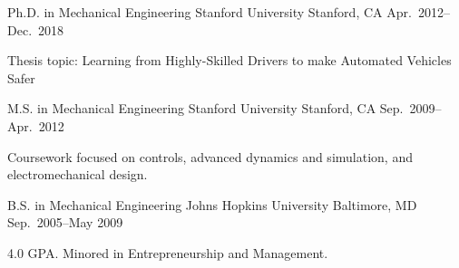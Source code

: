 \begin{cventries}
  \cventry%
    {Ph.D. in Mechanical Engineering}
    {Stanford University}
    {Stanford, CA}
    {Apr.\ 2012--Dec.\ 2018}
    {
      \begin{cvitems}
        \item{Thesis topic: Learning from Highly-Skilled Drivers to make Automated Vehicles Safer}
      \end{cvitems}
    }

  \cventry
    {M.S. in Mechanical Engineering}
    {Stanford University}
    {Stanford, CA}
    {Sep.\ 2009--Apr.\ 2012}
    {
      \begin{cvitems}
        \item{Coursework focused on controls, advanced dynamics and simulation, and electromechanical design.}
      \end{cvitems}
    }

  \cventry
    {B.S. in Mechanical Engineering}
    {Johns Hopkins University}
    {Baltimore, MD}
    {Sep.\ 2005--May 2009}
    {
      \begin{cvitems}
        \item{4.0 GPA\@. Minored in Entrepreneurship and Management.}
      \end{cvitems}
    }
\end{cventries}
